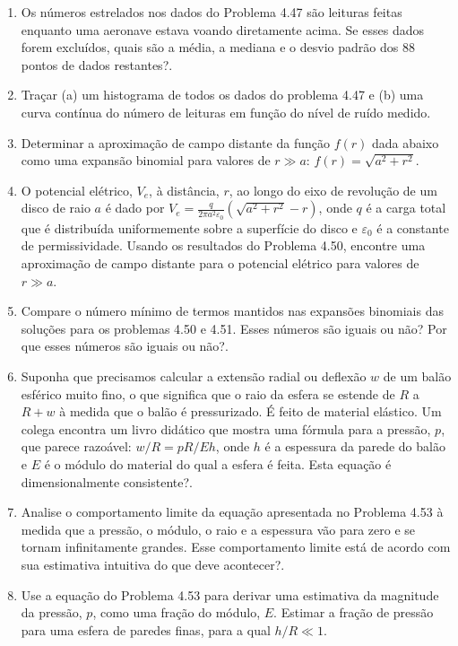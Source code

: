 \begin{enumerate}
    \item[\textbf{Problema 4.48.}] Os números estrelados nos dados do Problema 4.47 são leituras feitas enquanto uma aeronave estava voando diretamente acima. Se esses dados forem excluídos, quais são a média, a mediana e o desvio padrão dos 88 pontos de dados restantes?.
    \item[\textbf{Problema 4.49.}] Traçar (a) um histograma de todos os dados do problema 4.47 e (b) uma curva contínua do número de leituras em função do nível de ruído medido.
    \item[\textbf{Problema 4.50.}] Determinar a aproximação de campo distante da função $f(r)$ dada abaixo como uma expansão binomial para valores de $r \gg a$: $f(r) = \sqrt{a^2 + r^2}$.
    \item[\textbf{Problema 4.51.}] O potencial elétrico, $V_e$, à distância, $r$, ao longo do eixo de revolução de um disco de raio $a$ é dado por $V_e = \frac{q}{2\pi a^2 \varepsilon_0}(\sqrt{a^2 + r^2} - r)$, onde $q$ é a carga total que é distribuída uniformemente sobre a superfície do disco e $\varepsilon_0$ é a constante de permissividade. Usando os resultados do Problema 4.50, encontre uma aproximação de campo distante para o potencial elétrico para valores de $r \gg a$.
    \item[\textbf{Problema 4.52.}] Compare o número mínimo de termos mantidos nas expansões binomiais das soluções para os problemas 4.50 e 4.51. Esses números são iguais ou não? Por que esses números são iguais ou não?.
    \item[\textbf{Problema 4.53.}] Suponha que precisamos calcular a extensão radial ou deflexão $w$ de um balão esférico muito fino, o que significa que o raio da esfera se estende de $R$ a $R + w$ à medida que o balão é pressurizado. É feito de material elástico. Um colega encontra um livro didático que mostra uma fórmula para a pressão, $p$, que parece razoável: $w/R = pR/Eh$, onde $h$ é a espessura da parede do balão e $E$ é o módulo do material do qual a esfera é feita. Esta equação é dimensionalmente consistente?.
    \item[\textbf{Problema 4.54.}] Analise o comportamento limite da equação apresentada no Problema 4.53 à medida que a pressão, o módulo, o raio e a espessura vão para zero e se tornam infinitamente grandes. Esse comportamento limite está de acordo com sua estimativa intuitiva do que deve acontecer?.
    \item[\textbf{Problema 4.55.}] Use a equação do Problema 4.53 para derivar uma estimativa da magnitude da pressão, $p$, como uma fração do módulo, $E$. Estimar a fração de pressão para uma esfera de paredes finas, para a qual $h/R \ll 1$.
\end{enumerate}
